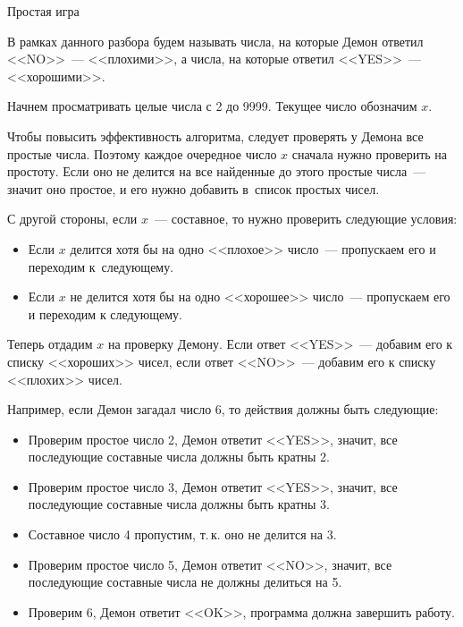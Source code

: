 \begin{tutorial}{Простая игра}

В рамках данного разбора будем называть числа, на которые Демон ответил <<NO>>~--- <<плохими>>, а числа, на которые ответил <<YES>>~--- <<хорошими>>.

Начнем просматривать целые числа с 2 до 9999. Текущее число обозначим $x$.

Чтобы повысить эффективность алгоритма, следует проверять у Демона все простые числа. Поэтому каждое очередное число $x$ сначала нужно проверить на простоту. Если оно не делится на все найденные до этого простые числа~--- значит оно простое, и его нужно добавить в~список простых чисел.

С другой стороны, если $x$~--- составное, то нужно проверить следующие условия:

\begin{itemize}
\setlength{\itemsep}{0pt}%
\item Если $x$ делится хотя бы на одно <<плохое>> число~--- пропускаем его и переходим к~следующему.
\item Если $x$ не делится хотя бы на одно <<хорошее>> число~--- пропускаем его и переходим к следующему.
\end{itemize}

Теперь отдадим $x$ на проверку Демону. Если ответ <<YES>>~--- добавим его к списку <<хороших>> чисел, если ответ <<NO>>~--- добавим его к списку <<плохих>> чисел.

Например, если Демон загадал число 6, то действия должны быть следующие:

\begin{itemize}
\setlength{\itemsep}{0pt}%
\item Проверим простое число 2, Демон ответит <<YES>>, значит, все последующие составные числа должны быть кратны 2.
\item Проверим простое число 3, Демон ответит <<YES>>, значит, все последующие составные числа должны быть кратны 3.
\item Составное число 4 пропустим, т.\,к. оно не делится на 3.
\item Проверим простое число 5, Демон ответит <<NO>>, значит, все последующие составные числа не должны делиться на 5.
\item Проверим 6, Демон ответит <<OK>>, программа должна завершить работу.
\end{itemize}

\end{tutorial}
